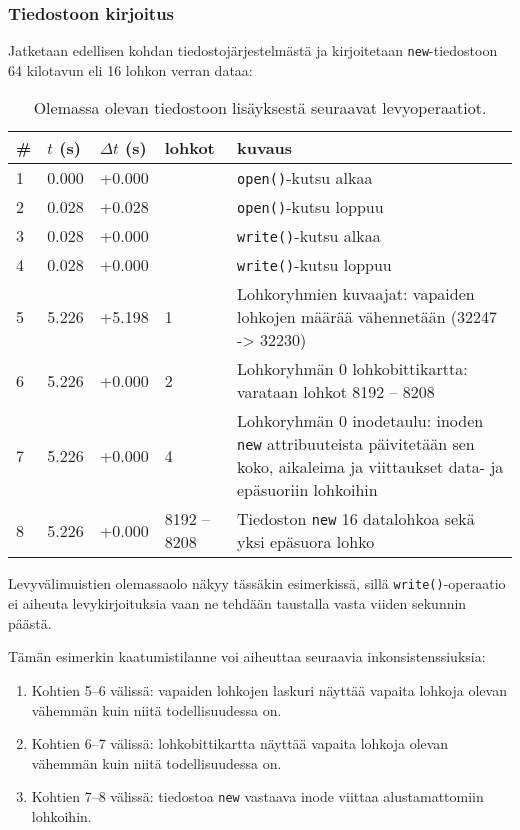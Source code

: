 \subsubsection{Tiedostoon kirjoitus}
\label{ChapExt2FileWrite}
Jatketaan edellisen kohdan tiedostojärjestelmästä ja kirjoitetaan \texttt{new}-tiedostoon 64 kilotavun eli 16 lohkon verran dataa:
\begin{table}[H]
\begin{tabular}{l | l | l | l | p{7cm}}
    \# & $t$ (s) & $\Delta t$ (s) & lohkot & kuvaus \\ \hline \hline
    1  & 0.000    & +0.000   &            & \texttt{open()}-kutsu alkaa    \\ \hline %
    2  & 0.028    & +0.028   &            & \texttt{open()}-kutsu loppuu   \\ \hline %
    3  & 0.028    & +0.000   &            & \texttt{write()}-kutsu alkaa   \\ \hline %
    4  & 0.028    & +0.000   &            & \texttt{write()}-kutsu loppuu  \\ \hline %
    5  & 5.226    & +5.198   & 1          & Lohkoryhmien kuvaajat: vapaiden lohkojen määrää vähennetään (32247 -> 32230)                             \\ \hline %
    6  & 5.226    & +0.000   & 2          & Lohkoryhmän 0 lohkobittikartta: varataan lohkot 8192 -- 8208         \\ \hline %
    7  & 5.226    & +0.000   & 4          & Lohkoryhmän 0 inodetaulu: inoden \texttt{new} attribuuteista päivitetään sen koko, aikaleima ja viittaukset data- ja epäsuoriin lohkoihin               \\ \hline %
    8  & 5.226    & +0.000   & 8192 -- 8208 & Tiedoston \texttt{new} 16 datalohkoa sekä yksi epäsuora lohko                            \\        %
\end{tabular}
\caption{Olemassa olevan tiedostoon lisäyksestä seuraavat levyoperaatiot.}
\end{table}

Levyvälimuistien olemassaolo näkyy tässäkin esimerkissä,
sillä \texttt{write()}-operaatio ei aiheuta levykirjoituksia vaan ne tehdään taustalla vasta viiden sekunnin päästä.

Tämän esimerkin kaatumistilanne voi aiheuttaa seuraavia inkonsistenssiuksia:
\begin{enumerate}
    \item{Kohtien 5--6 välissä: vapaiden lohkojen laskuri näyttää vapaita lohkoja olevan vähemmän kuin niitä todellisuudessa on.}
    \item{Kohtien 6--7 välissä: lohkobittikartta näyttää vapaita lohkoja olevan vähemmän kuin niitä todellisuudessa on.}
    \item{Kohtien 7--8 välissä: tiedostoa \texttt{new} vastaava inode viittaa alustamattomiin lohkoihin.}
\end{enumerate}

